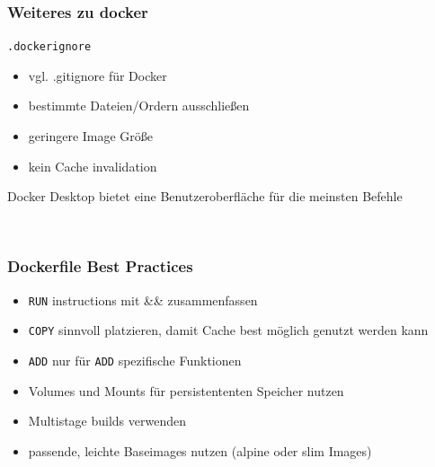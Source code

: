 \documentclass[22pt]{beamer}
\newcommand{\code}[1]{\colorbox{gray!15}{\texttt{#1}}}
\begin{document}
\begin{frame}[fragile]
    \frametitle{Weiteres zu docker}
    \code{.dockerignore}
    \begin{itemize}
        \item vgl. .gitignore für Docker
        \item bestimmte Dateien/Ordern ausschließen
        \item geringere Image Größe
        \item kein Cache invalidation
    \end{itemize}
    \medskip\pause
    Docker Desktop bietet eine Benutzeroberfläche für die meinsten Befehle\\\pause
    \begin{verbatim}


\end{verbatim}

\end{frame} 
\begin{frame}[t]
    \frametitle{Dockerfile Best Practices}
    \begin{itemize}
        \item \code{RUN} instructions mit \&\& zusammenfassen
        \item \code{COPY} sinnvoll platzieren, damit Cache best möglich genutzt werden kann
        \item \code{ADD} nur für \code{ADD} spezifische Funktionen
        \item Volumes und Mounts für persistententen Speicher nutzen
        \item Multistage builds verwenden
        \item passende, leichte Baseimages nutzen (alpine oder slim Images)
    \end{itemize} 
\end{frame}
\end{document}
